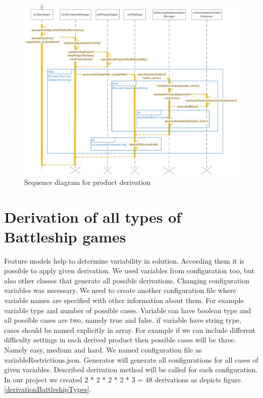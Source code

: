 \documentclass[11pt,english,a4paper,twoside]{article}
\begin{document}
\begin{figure}[!t]  %
					\begin{center}
									\includegraphics[width=\linewidth]{fig/derivationProcessTight.png}
									\caption{Sequence diagram for product derivation}
									\label{derivationProductSequenceDiagram}
					\end{center}
\end{figure}


\section{Derivation of all types of Battleship games} \label{allDerivations}

Feature models help to determine variability in solution. According them it is possible to apply given derivation. We used variables from configuration too, but also other classes that generate all possible derivations. Changing configuration variables was necessary. We need to create another configuration file where variable names are specified with other information about them. For example variable type and number of possible cases. Variable can have boolean type and all possible cases are two, namely true and false. if variable have string type, cases should be named explicitly in array. For example if we can include different difficulty settings in each derived product then possible cases will be three. Namely easy, medium and hard. We named configuration file as variableRestrictions.json. Generator will generate all configurations for all cases of given variables. Described derivation method will be called for each configuration. In our project we created 2 * 2 * 2 * 2 * 3 = 48 derivations as depicts figure \ref{derivationBattleshipTypes}.  
\end{document}
